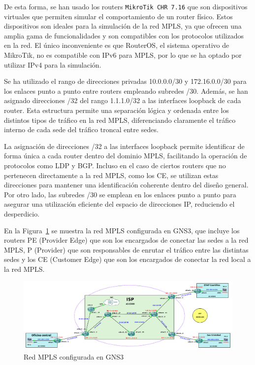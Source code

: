 \vspace{0.5cm}
De esta forma, se han usado los routers \texttt{MikroTik CHR 7.16} \cite{mikrotik_cloud_hosted_router} que son dispositivos virtuales que permiten simular el comportamiento de un router físico. Estos dispositivos son ideales para la simulación de la red MPLS, ya que ofrecen una amplia gama de funcionalidades y son compatibles con los
protocolos utilizados en la red. El único inconveniente es que RouterOS, el sistema operativo de MikroTik, no es compatible con IPv6 para MPLS, por lo que se ha optado por utilizar IPv4 para la simulación.

\vspace{0.5cm}
Se ha utilizado el rango de direcciones privadas 10.0.0.0/30 y 172.16.0.0/30 para los enlaces punto a punto entre routers empleando subredes /30. Además, se han asignado direcciones /32 del rango 1.1.1.0/32 a las interfaces loopback de cada router. Esta estructura permite una separación lógica y ordenada entre los distintos tipos de tráfico en la red MPLS, diferenciando claramente el tráfico interno de cada sede del tráfico troncal entre sedes.

\vspace{0.5cm}
La asignación de direcciones /32 a las interfaces loopback permite identificar de forma única a cada router dentro del dominio MPLS, facilitando la operación de protocolos como LDP y BGP. Incluso en el caso de ciertos routers que no
pertenecen directamente a la red MPLS, como los CE, se utilizan estas direcciones para mantener una identificación coherente dentro del diseño general. Por otro lado, las subredes /30 se emplean en los enlaces punto a punto para asegurar una utilización eficiente del espacio de direcciones IP, reduciendo el desperdicio.

\vspace{0.5cm}
En la Figura~\ref{fig:red_mpls} se muestra la red MPLS configurada en GNS3, que incluye los routers PE (Provider Edge) que son los encargados de conectar las sedes a la red MPLS, P (Provider) que son responsables de enrutar el tráfico entre las distintas sedes y los CE (Customer Edge) que son los encargados de conectar la red local a la red MPLS.

\begin{figure}[H]
	\centering
	\includegraphics[width=1\textwidth]{images/red_mpls.png}
	\caption{Red MPLS configurada en GNS3}
	\label{fig:red_mpls}
\end{figure}

